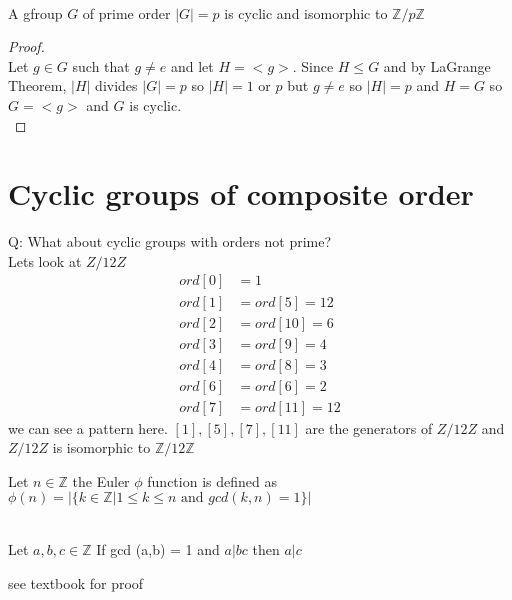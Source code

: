 \documentclass{article}
\begin{document}
\begin{proposition}[2.7.2] \leavevmode \\ 
    A gfroup $G$ of prime order $|G| = p$ is cyclic and isomorphic to $\mathbb{Z} / p\mathbb{Z}$
\end{proposition}
\begin{proof} \leavevmode \\ 
    Let $g \in G$ such that $g \not = e$ and let $H = <g>$. Since $H \leq G$ and by LaGrange Theorem, $|H|$ divides $|G| = p$ so $|H| = 1$ or $p$ but $g \not = e$ so $|H| = p$ and $H = G$ so $G = <g>$ and $G$ is cyclic. \\
\end{proof}

\section*{Cyclic groups of composite order}
Q: What about cyclic groups with orders not prime? \\ 
Lets look at $Z / 12Z$ \\
\begin{align*}
    ord[0] &= 1 \\
    ord[1] &= ord[5] = 12 \\
    ord[2] &= ord[10] = 6 \\
    ord[3] &= ord[9] = 4 \\
    ord[4] &= ord[8] = 3 \\
    ord[6] &= ord[6] = 2 \\ 
    ord[7] &= ord[11] = 12
\end{align*}
we can see a pattern here.
$[1], [5], [7], [11]$ are the generators of $Z / 12Z$ and $Z / 12Z$ is isomorphic to $\mathbb{Z} / 12\mathbb{Z}$

\begin{definition}
    Let $n \in \mathbb{Z}$ the Euler $\phi$ function is defined as $\phi(n) = | \{ k \in \mathbb{Z} | 1 \leq k \leq n \text{ and } gcd(k,n) = 1 \} |$
\end{definition}

\begin{lemma}[Cor 1.5.10] \leavevmode \\
     Let $a, b, c \in \mathbb{Z}$ If gcd (a,b) = 1 and $a | bc$ then $a|c$ 
\end{lemma} see textbook for proof 
\end{document}
